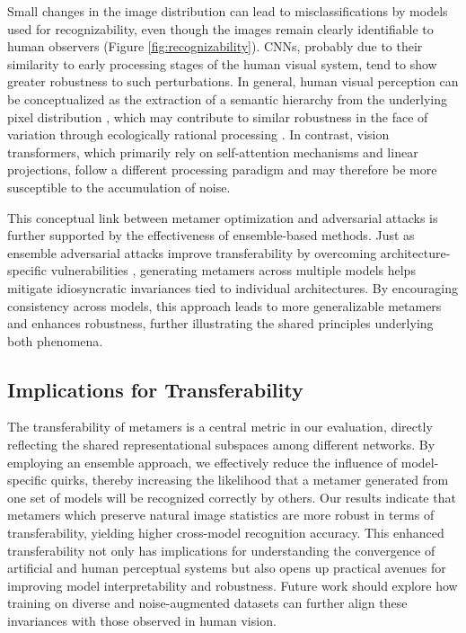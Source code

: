 \documentclass[pdflatex,sn-mathphys-num]{sn-jnl}%
\theoremstyle{thmstyleone}%
\theoremstyle{thmstyletwo}%
\theoremstyle{thmstylethree}%
\begin{document}
Small changes in the image distribution can lead to misclassifications by models used for recognizability, even though the images remain clearly identifiable to human observers (Figure \ref{fig:recognizability}). CNNs, probably due to their similarity to early processing stages of the human visual system, tend to show greater robustness to such perturbations. In general, human visual perception can be conceptualized as the extraction of a semantic hierarchy from the underlying pixel distribution \cite{marr2010vision}, which may contribute to similar robustness in the face of variation through ecologically rational processing \cite{todd2012ecological}. In contrast, vision transformers, which primarily rely on self-attention mechanisms and linear projections, follow a different processing paradigm and may therefore be more susceptible to the accumulation of noise.

This conceptual link between metamer optimization and adversarial attacks is further supported by the effectiveness of ensemble-based methods. Just as ensemble adversarial attacks improve transferability by overcoming architecture-specific vulnerabilities \cite{tramer_ensemble_2020}, generating metamers across multiple models helps mitigate idiosyncratic invariances tied to individual architectures. By encouraging consistency across models, this approach leads to more generalizable metamers and enhances robustness, further illustrating the shared principles underlying both phenomena.


\subsection{Implications for Transferability}
The transferability of metamers is a central metric in our evaluation, directly reflecting the shared representational subspaces among different networks. By employing an ensemble approach, we effectively reduce the influence of model-specific quirks, thereby increasing the likelihood that a metamer generated from one set of models will be recognized correctly by others. Our results indicate that metamers which preserve natural image statistics are more robust in terms of transferability, yielding higher cross-model recognition accuracy. This enhanced transferability not only has implications for understanding the convergence of artificial and human perceptual systems but also opens up practical avenues for improving model interpretability and robustness. Future work should explore how training on diverse and noise-augmented datasets can further align these invariances with those observed in human vision.
\end{document}
